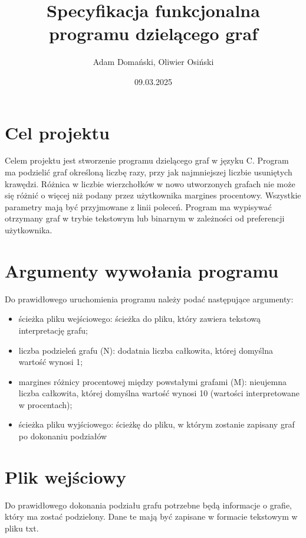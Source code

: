 \documentclass{article}
\title{\textbf{Specyfikacja funkcjonalna programu dzielącego graf}}
\author{Adam Domański, Oliwier Osiński}
\date{09.03.2025}
\begin{document}
\maketitle

\section*{Cel projektu}

Celem projektu jest stworzenie programu dzielącego graf w języku C. Program ma podzielić graf określoną liczbę razy, przy jak najmniejszej liczbie usuniętych krawędzi. Różnica w liczbie wierzchołków w nowo utworzonych grafach nie może się różnić o więcej niż podany przez użytkownika margines procentowy. Wszystkie parametry mają być przyjmowane z linii poleceń. Program ma wypisywać otrzymany graf w trybie tekstowym lub binarnym w zależności od preferencji użytkownika.

\section*{Argumenty wywołania programu}
Do prawidłowego uruchomienia programu należy podać następujące argumenty:
\begin{itemize}
    \item ścieżka pliku wejściowego: ścieżka do pliku, który zawiera tekstową interpretację grafu;

    \item liczba podzieleń grafu (N): dodatnia liczba całkowita, której domyślna wartość wynosi 1;

    \item margines różnicy procentowej między powstałymi grafami (M): nieujemna liczba całkowita, której domyślna wartość wynosi 10 (wartości interpretowane w procentach);

    \item ścieżka pliku wyjściowego: ścieżkę do pliku, w którym zostanie zapisany graf po dokonaniu podziałów
    
\end{itemize}

\section*{Plik wejściowy}
Do prawidłowego dokonania podziału grafu potrzebne będą informacje o grafie, który ma zostać podzielony. Dane te mają być zapisane w formacie tekstowym w pliku txt.\\
\end{document}
